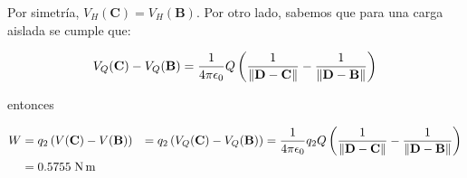 \documentclass[12pt]{article}
\DeclarePairedDelimiter{\norm}{\Vert}{\Vert}
\begin{document}
Por simetría, $V_H(\mathbf{C})=V_H(\mathbf{B})$. Por otro lado, sabemos que
para una carga aislada se cumple que:

\begin{align*}
    V_Q(\mathbf{C})-V_Q(\mathbf{B})=\frac{1}{4\pi\epsilon_0}Q\left(\frac{1}{\norm{\mathbf{D}-\mathbf{C}}}-\frac{1}{\norm{\mathbf{D}-\mathbf{B}}}\right)
\end{align*}

\noindent entonces

\begin{align*}
    W&=q_2\left(V(\mathbf{C})-V(\mathbf{B})\right)&=q_2\left(V_Q(\mathbf{C})-V_Q(\mathbf{B})\right)=\frac{1}{4\pi\epsilon_0}q_2Q\left(\frac{1}{\norm{\mathbf{D}-\mathbf{C}}}-\frac{1}{\norm{\mathbf{D}-\mathbf{B}}}\right)\\
     &=0.5755\;\text{N\,m}
\end{align*}

\noindent{}
\end{document}
